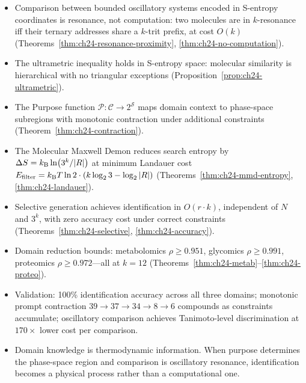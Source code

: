 \bigskip
\begin{tcolorbox}[colback=crownblue!5, colframe=crownblue!60!black,
                  title={\textbf{Chapter 24 Summary}}]
\begin{itemize}[noitemsep]
  \item Comparison between bounded oscillatory systems encoded in S-entropy
    coordinates is resonance, not computation: two molecules are in
    $k$-resonance iff their ternary addresses share a $k$-trit prefix, at
    cost $O(k)$ (Theorems~\ref{thm:ch24-resonance-proximity},
    \ref{thm:ch24-no-computation}).
  \item The ultrametric inequality holds in S-entropy space: molecular
    similarity is hierarchical with no triangular exceptions
    (Proposition~\ref{prop:ch24-ultrametric}).
  \item The Purpose function $\mathcal{P} : \mathcal{C} \to 2^{\mathcal{S}}$
    maps domain context to phase-space subregions with monotonic contraction
    under additional constraints
    (Theorem~\ref{thm:ch24-contraction}).
  \item The Molecular Maxwell Demon reduces search entropy by
    $\Delta S = k_{\mathrm{B}} \ln(3^k/|R|)$ at minimum Landauer cost
    $E_{\mathrm{filter}} = k_{\mathrm{B}} T \ln 2 \cdot (k\log_2 3 - \log_2|R|)$
    (Theorems~\ref{thm:ch24-mmd-entropy}, \ref{thm:ch24-landauer}).
  \item Selective generation achieves identification in $O(r \cdot k)$,
    independent of $N$ and $3^k$, with zero accuracy cost under correct
    constraints (Theorems~\ref{thm:ch24-selective}, \ref{thm:ch24-accuracy}).
  \item Domain reduction bounds: metabolomics $\rho \geq 0.951$,
    glycomics $\rho \geq 0.991$, proteomics $\rho \geq 0.972$---all
    at $k = 12$ (Theorems~\ref{thm:ch24-metab}--\ref{thm:ch24-proteo}).
  \item Validation: 100\% identification accuracy across all three domains;
    monotonic prompt contraction $39 \to 37 \to 34 \to 8 \to 6$ compounds
    as constraints accumulate; oscillatory comparison achieves Tanimoto-level
    discrimination at $170\times$ lower cost per comparison.
  \item Domain knowledge is thermodynamic information.  When purpose determines
    the phase-space region and comparison is oscillatory resonance,
    identification becomes a physical process rather than a computational one.
\end{itemize}
\end{tcolorbox}
